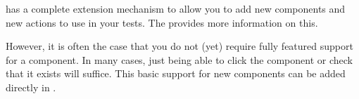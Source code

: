 \app{} has a complete extension mechanism to allow you to add new components and new actions to use in your tests. The  provides more information on this. 

However, it is often the case that you do not (yet) require fully featured support for a component. In many cases, just being able to click the component or check that it exists will suffice. This basic support for new components can be added directly in \app{}.
